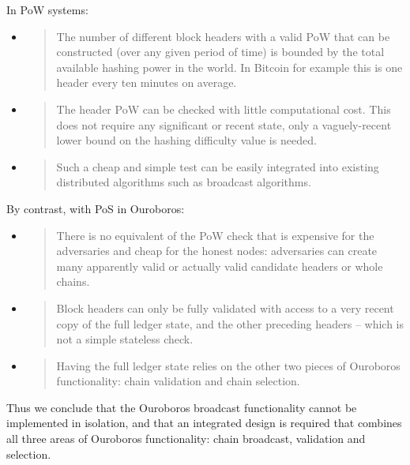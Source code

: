 \documentclass[11pt,a4paper]{article}
\begin{document}
In PoW systems:

\begin{itemize}
\item
  \begin{quote}
  The number of different block headers with a valid PoW that can be
  constructed (over any given period of time) is bounded by the total
  available hashing power in the world. In Bitcoin for example this is
  one header every ten minutes on average.
  \end{quote}
\item
  \begin{quote}
  The header PoW can be checked with little computational cost. This
  does not require any significant or recent state, only a
  vaguely-recent lower bound on the hashing difficulty value is needed.
  \end{quote}
\item
  \begin{quote}
  Such a cheap and simple test can be easily integrated into existing
  distributed algorithms such as broadcast algorithms.
  \end{quote}
\end{itemize}

By contrast, with PoS in Ouroboros:

\begin{itemize}
\item
  \begin{quote}
  There is no equivalent of the PoW check that is expensive for the
  adversaries and cheap for the honest nodes: adversaries can create
  many apparently valid or actually valid candidate headers or whole
  chains.
  \end{quote}
\item
  \begin{quote}
  Block headers can only be fully validated with access to a very recent
  copy of the full ledger state, and the other preceding headers --
  which is not a simple stateless check.
  \end{quote}
\item
  \begin{quote}
  Having the full ledger state relies on the other two pieces of
  Ouroboros functionality: chain validation and chain selection.
  \end{quote}
\end{itemize}

Thus we conclude that the Ouroboros broadcast functionality cannot be
implemented in isolation, and that an integrated design is required that
combines all three areas of Ouroboros functionality: chain broadcast,
validation and selection.
\end{document}
